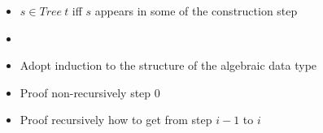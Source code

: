 \begin{itemize}
\begin{itemize}
            \item $s \in Tree \ t$ iff $s$ appears in some of the construction step
            \item {}
        \end{itemize}
        \begin{itemize}
            \item Adopt induction to the structure of the algebraic data type
            \item Proof non-recursively step $0$
            \item Proof recursively how to get from step $i - 1$ to $i$
        \end{itemize}
\end{itemize}
